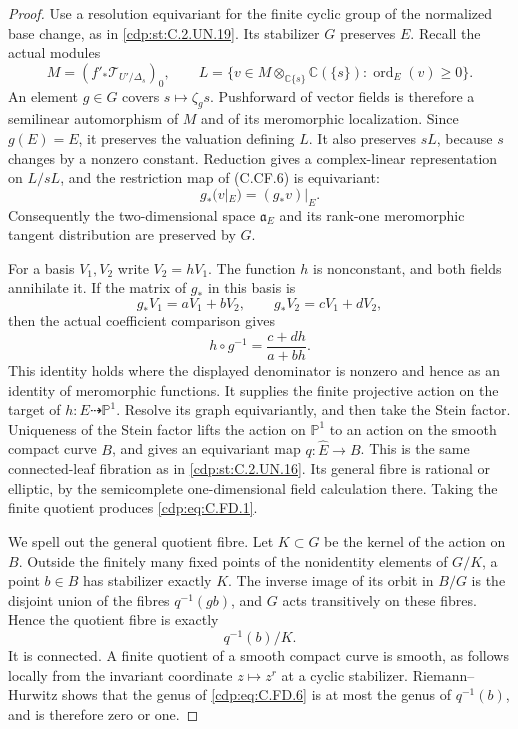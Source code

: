 \begin{proof}
Use a resolution equivariant for the finite cyclic group of the
normalized base change, as in \ref{cdp:st:C.2.UN.19}. Its stabilizer $G$
preserves $E$. Recall the actual modules
\[
 M=(f'_*\mathcal T_{U'/\Delta_s})_0,
 \qquad
 L=\{v\in M\otimes_{\mathbb C\{s\}}\mathbb C(\{s\}):
                  \operatorname{ord}_E(v)\ge0\}.
                                                               \tag{C.FD.3}\label{cdp:eq:C.FD.3}
\]
An element $g\in G$ covers $s\mapsto\zeta_gs$. Pushforward of
vector fields is therefore a semilinear automorphism of $M$
and of its meromorphic localization. Since $g(E)=E$, it
preserves the valuation defining $L$. It also preserves $sL$,
because $s$ changes by a nonzero constant. Reduction gives
a complex-linear representation on $L/sL$, and the restriction
map of (C.CF.6) is equivariant:
\[
 g_*\bigl(v|_E\bigr)=(g_*v)|_E.
                                                               \tag{C.FD.4}\label{cdp:eq:C.FD.4}
\]
Consequently the two-dimensional space $\mathfrak a_E$ and
its rank-one meromorphic tangent distribution are preserved
by $G$.

For a basis $V_1,V_2$ write $V_2=hV_1$. The function $h$ is
nonconstant, and both fields annihilate it. If the matrix of
$g_*$ in this basis is
\[
       g_*V_1=aV_1+bV_2,\qquad
       g_*V_2=cV_1+dV_2,
\]
then the actual coefficient comparison gives
\[
              h\circ g^{-1}=\frac{c+dh}{a+bh}.
                                                               \tag{C.FD.5}\label{cdp:eq:C.FD.5}
\]
This identity holds where the displayed denominator is nonzero
and hence as an identity of meromorphic functions. It supplies
the finite projective action on the target of
$h:E\dashrightarrow\mathbb P^1$. Resolve its graph
equivariantly, and then take the Stein factor. Uniqueness of
the Stein factor lifts the action on $\mathbb P^1$ to an action
on the smooth compact curve $B$, and gives an equivariant map
$q:\widehat E\to B$. This is the same connected-leaf
fibration as in \ref{cdp:st:C.2.UN.16}. Its general fibre is rational or
elliptic, by the semicomplete one-dimensional field calculation
there. Taking the finite quotient produces \eqref{cdp:eq:C.FD.1}.

We spell out the general quotient fibre. Let
$K\subset G$ be the kernel of the action on $B$. Outside
the finitely many fixed points of the nonidentity elements
of $G/K$, a point $b\in B$ has stabilizer exactly $K$.
The inverse image of its orbit in $B/G$ is the disjoint union
of the fibres $q^{-1}(gb)$, and $G$ acts transitively on these
fibres. Hence the quotient fibre is exactly
\[
                       q^{-1}(b)/K.
                                                               \tag{C.FD.6}\label{cdp:eq:C.FD.6}
\]
It is connected. A finite quotient of a smooth compact curve
is smooth, as follows locally from the invariant coordinate
$z\mapsto z^r$ at a cyclic stabilizer. Riemann--Hurwitz
shows that the genus of \eqref{cdp:eq:C.FD.6} is at most the genus of
$q^{-1}(b)$, and is therefore zero or one.


\end{proof}
